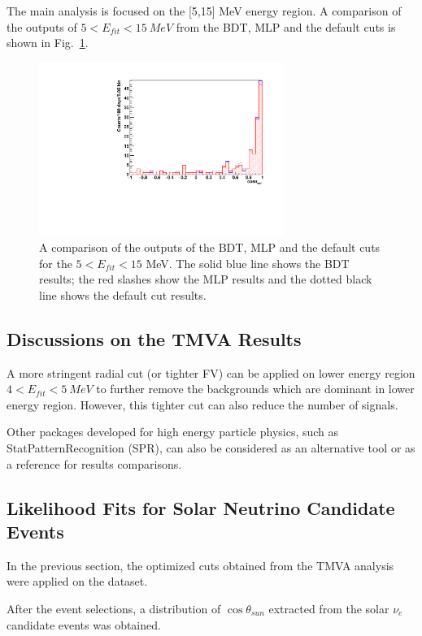 

The main analysis is focused on the [5,15] MeV energy region. A comparison of the outputs of $5<E_{fit}<15~MeV$ from the BDT, MLP and the default cuts is shown in Fig.~\ref{compare_cosThetaToSun_5to15}.
\begin{figure}[!htb]
	\centering
	\includegraphics[width=8cm]{Compare_cosThetaSun_5to15.pdf}
	\caption[A comparison of the outputs of the BDT, MLP and the default cuts for the $5<E_{fit}<15$ MeV.]{A comparison of the outputs of the BDT, MLP and the default cuts for the $5<E_{fit}<15$ MeV. The solid blue line shows the BDT results; the red slashes show the MLP results and the dotted black line shows the default cut results.}
	\label{compare_cosThetaToSun_5to15}
\end{figure}

\subsection{Discussions on the TMVA Results}
A more stringent radial cut (or tighter FV) can be applied on lower energy region $4<E_{fit}<5~MeV$ to further remove the backgrounds which are dominant in lower energy region. However, this tighter cut can also reduce the number of signals.

Other packages developed for high energy particle physics, such as StatPatternRecognition (SPR)\cite{sprWebsite}, can also be considered as an alternative tool or as a reference for results comparisons. 

\subsection{Likelihood Fits for Solar Neutrino Candidate Events}
In the previous section, the optimized cuts obtained from the TMVA analysis were applied on the dataset. 

After the event selections, a distribution of $\cos\theta_{sun}$ extracted from the solar $\nu_e$ candidate events was obtained. 

